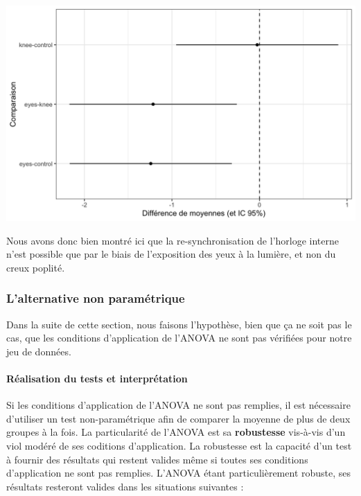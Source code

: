 \documentclass[a4paperpaper,]{article}
\let\oldparagraph\paragraph
\renewcommand{\paragraph}[1]{\oldparagraph{#1}\mbox{}}
\begin{document}
\begin{center}\includegraphics[width=0.9\linewidth]{figure/unnamed-chunk-89-1} \end{center}

Nous avons donc bien montré ici que la re-synchronisation de l'horloge interne n'est possible que par le biais de l'exposition des yeux à la lumière, et non du creux poplité.

\hypertarget{lalternative-non-paramuxe9trique-3}{%
\subsubsection{L'alternative non paramétrique}\label{lalternative-non-paramuxe9trique-3}}

Dans la suite de cette section, nous faisons l'hypothèse, bien que ça ne soit pas le cas, que les conditions d'application de l'ANOVA ne sont pas vérifiées pour notre jeu de données.

\hypertarget{ruxe9alisation-du-tests-et-interpruxe9tation}{%
\paragraph{Réalisation du tests et interprétation}\label{ruxe9alisation-du-tests-et-interpruxe9tation}}

Si les conditions d'application de l'ANOVA ne sont pas remplies, il est nécessaire d'utiliser un test non-paramétrique afin de comparer la moyenne de plus de deux groupes à la fois. La particularité de l'ANOVA est sa \textbf{robustesse} vis-à-vis d'un viol modéré de ses coditions d'application. La robustesse est la capacité d'un test à fournir des résultats qui restent valides même si toutes ses conditions d'application ne sont pas remplies. L'ANOVA étant particulièrement robuste, ses résultats resteront valides dans les situations suivantes :
\end{document}

